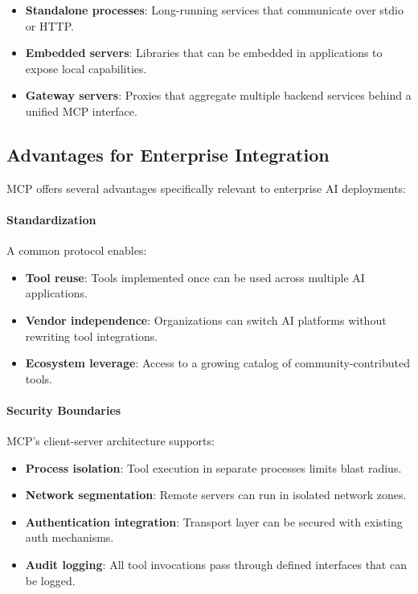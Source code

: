 \documentclass[a4paper,twoside]{sapthesis}
\begin{document}
\begin{itemize}
    \item \textbf{Standalone processes}: Long-running services that communicate over stdio or HTTP.
    \item \textbf{Embedded servers}: Libraries that can be embedded in applications to expose local capabilities.
    \item \textbf{Gateway servers}: Proxies that aggregate multiple backend services behind a unified MCP interface.
\end{itemize}

\subsection{Advantages for Enterprise Integration}

MCP offers several advantages specifically relevant to enterprise AI deployments:

\paragraph{Standardization}

A common protocol enables:
\begin{itemize}
    \item \textbf{Tool reuse}: Tools implemented once can be used across multiple AI applications.
    \item \textbf{Vendor independence}: Organizations can switch AI platforms without rewriting tool integrations.
    \item \textbf{Ecosystem leverage}: Access to a growing catalog of community-contributed tools.
\end{itemize}

\paragraph{Security Boundaries}

MCP's client-server architecture supports:
\begin{itemize}
    \item \textbf{Process isolation}: Tool execution in separate processes limits blast radius.
    \item \textbf{Network segmentation}: Remote servers can run in isolated network zones.
    \item \textbf{Authentication integration}: Transport layer can be secured with existing auth mechanisms.
    \item \textbf{Audit logging}: All tool invocations pass through defined interfaces that can be logged.
\end{itemize}
\end{document}
